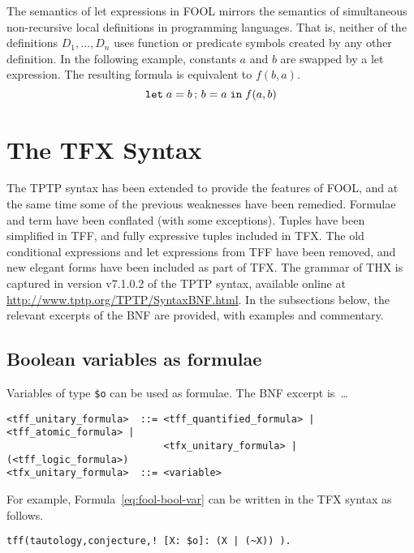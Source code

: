 \documentclass{easychair}
\begin{document}
The semantics of let expressions in FOOL mirrors the semantics of
simultaneous non-recursive local definitions in programming languages. That is,
neither of the definitions $D_1,\ldots,\allowbreak D_n$ uses function or
predicate symbols created by any other definition. In the following example,
constants $a$ and $b$ are swapped by a let expression. The resulting formula
is equivalent to $f(b, a)$.
\begin{equation}\label{eq:parallel-let-example}
\mathtt{let}\;{a}={b}\,;\,{b}={a}\;\mathtt{in}\;f(a, b)
\end{equation}

\section{The TFX Syntax}
\label{TFX}

The TPTP syntax has been extended to provide the features of FOOL,
and at the same time some of the previous weaknesses have been remedied.
Formulae and term have been conflated (with some exceptions).
Tuples have been simplified in TFF, and fully expressive tuples included in 
TFX. 
The old conditional expressions and let expressions from TFF have been 
removed, and new elegant forms have been included as part of TFX. 
The grammar of THX is captured in version v7.1.0.2 of the TPTP syntax,
available online at \url{http://www.tptp.org/TPTP/SyntaxBNF.html}.
In the subsections below, the relevant excerpts of the BNF are provided,
with examples and commentary.

\subsection{Boolean variables as formulae}

Variables of type {\tt \$o} can be used as formulae. 
The BNF excerpt is~\ldots
\begin{verbatim}
<tff_unitary_formula>  ::= <tff_quantified_formula> | <tff_atomic_formula> |
                           <tfx_unitary_formula> | (<tff_logic_formula>)
<tfx_unitary_formula>  ::= <variable>
\end{verbatim}

For example, Formula~\ref{eq:fool-bool-var} can be written in the TFX syntax as
follows.
\begin{verbatim}
tff(tautology,conjecture,! [X: $o]: (X | (~X)) ).
\end{verbatim}
\end{document}
